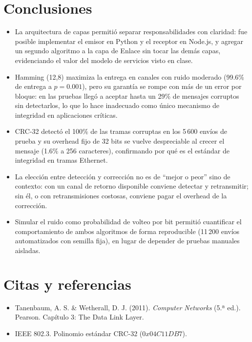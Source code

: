 \documentclass[11pt,letterpaper]{article}
\begin{document}

\section{Conclusiones}

\begin{itemize}
  \item La arquitectura de capas permitió separar responsabilidades con
        claridad: fue posible implementar el emisor en Python y el receptor en
        Node.js, y agregar un segundo algoritmo a la capa de Enlace sin tocar
        las demás capas, evidenciando el valor del modelo de servicios visto en
        clase.
  \item Hamming (12,8) maximiza la entrega en canales con ruido moderado
        (99.6\% de entrega a $p=0.001$), pero su garantía se rompe con más de
        un error por bloque: en las pruebas llegó a aceptar hasta un 29\% de
        mensajes corruptos sin detectarlos, lo que lo hace inadecuado como
        único mecanismo de integridad en aplicaciones críticas.
  \item CRC-32 detectó el 100\% de las tramas corruptas en los 5\,600 envíos
        de prueba y su overhead fijo de 32 bits se vuelve despreciable al
        crecer el mensaje (1.6\% a 256 caracteres), confirmando por qué es el
        estándar de integridad en tramas Ethernet.
  \item La elección entre detección y corrección no es de ``mejor o peor''
        sino de contexto: con un canal de retorno disponible conviene detectar
        y retransmitir; sin él, o con retransmisiones costosas, conviene pagar
        el overhead de la corrección.
  \item Simular el ruido como probabilidad de volteo por bit permitió
        cuantificar el comportamiento de ambos algoritmos de forma
        reproducible (11\,200 envíos automatizados con semilla fija), en lugar
        de depender de pruebas manuales aisladas.
\end{itemize}

\section{Citas y referencias}

\begin{itemize}
  \item Tanenbaum, A. S. \& Wetherall, D. J. (2011). \emph{Computer Networks}
        (5.ª ed.). Pearson. Capítulo 3: The Data Link Layer.
  \item IEEE 802.3. Polinomio estándar CRC-32 ($0x04C11DB7$).
\end{itemize}
\end{document}
